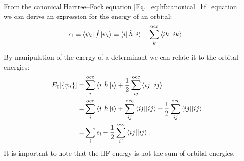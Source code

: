 \documentclass[../Main/chem532-notes.tex]{subfiles}
\begin{document}
From the canonical Hartree--Fock equation [Eq.~\eqref{eq:hf:canonical_hf_equation}] we can derive an expression for the energy of an orbital:
\begin{equation}
\epsilon_{i}
=
\bra{\psi_{i}} \hat{f}\ket{\psi_{i}} = \bra{i} \hat{h} \ket{i} + \sum_{k}^{\rm occ} \bra{ik}\!\ket{ik}.
\end{equation}

By manipulation of the energy of a determinant we can relate it to the orbital energies:
\begin{equation}
\begin{split}
E_0[\{ \psi_i \}] =& \sum_i^{\rm occ} \bra{i} \hat{h} \ket{i} + \frac{1}{2} \sum_{ij}^{\rm occ} \bra{ij}\!\ket{ij} \\
=& \sum_i^{\rm occ} \bra{i} \hat{h} \ket{i} + \sum_{ij}^{\rm occ} \bra{ij}\!\ket{ij}
-\frac{1}{2} \sum_{ij}^{\rm occ} \bra{ij}\!\ket{ij} \\
=& \sum_i \epsilon_i - 
\frac{1}{2} \sum_{ij}^{\rm occ} \bra{ij}\!\ket{ij}.
\end{split}
\end{equation}
It is important to note that the HF energy is not the sum of orbital energies.
\end{document}
